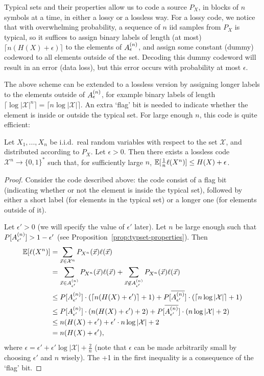 Typical sets and their properties allow us to code a source $P_X$, in blocks of $n$ symbols at a time, in either a lossy or a lossless way. For a lossy code, we notice that with overwhelming probability, a sequence of $n$ iid samples from $P_X$ is typical, so it suffices to assign binary labels of length (at most) $\lceil n (H(X) + \epsilon)\rceil$ to the elements of $A_{\epsilon}^{(n)}$, and assign some constant (dummy) codeword to all elements outside of the set. Decoding this dummy codeword will result in an error (data loss), but this error occurs with probability at most $\epsilon$.

The above scheme can be extended to a lossless version by assigning longer labels to the elements outside of $A_{\epsilon}^{(n)}$, for example binary labels of length $\lceil \log |\mathcal{X}|^n\rceil = \lceil n \log |\mathcal{X}|\rceil$. An extra `flag' bit is needed to indicate whether the element is inside or outside the typical set. For large enough $n$, this code is quite efficient:
\begin{theorem}
Let $X_1, ..., X_n$ be i.i.d.\ real random variables with respect to the set $\mathcal{X}$, and distributed according to $P_X$. Let $\epsilon > 0$. Then there exists a lossless code $\mathcal{X}^n \to \{0,1\}^*$ such that, for sufficiently large $n$, $\mathbb{E}[\frac{1}{n} \ell(X^n)] \leq H(X) + \epsilon$.
\end{theorem}
\begin{proof}
Consider the code described above: the code consist of a flag bit (indicating whether or not the element is inside the typical set), followed by either a short label (for elements in the typical set) or a longer one (for elements outside of it).

Let $\epsilon' > 0$ (we will specify the value of $\epsilon'$ later). Let $n$ be large enough such that $P[A_{\epsilon'}^{(n)}] > 1 - \epsilon'$ (see Proposition~\ref{prop:typset-properties}). Then
\begin{align}
\mathbb{E}[\ell(X^n)] &= \sum_{\vec{x} \in \mathcal{X}^n} P_{X^n}(\vec{x}) \ell(\vec{x})\nonumber\\
&= \sum_{\vec{x} \in A_{\epsilon'}^{(n)}} P_{X^n}(\vec{x}) \ell(\vec{x}) + \sum_{\vec{x} \not\in A_{\epsilon'}^{(n)}} P_{X^n}(\vec{x}) \ell(\vec{x})\nonumber\\
&\leq P[A_{\epsilon'}^{(n)}] \cdot (\lceil n (H(X) + \epsilon') \rceil + 1) + P[\overline{A_{\epsilon'}^{(n)}}] \cdot (\lceil n \log |\mathcal{X}| \rceil + 1)\nonumber\\
&\leq P[A_{\epsilon'}^{(n)}] \cdot (n (H(X) + \epsilon') + 2) + P[\overline{A_{\epsilon'}^{(n)}}] \cdot (n \log |\mathcal{X}| + 2)\nonumber\\
&\leq n ( H(X) + \epsilon') + \epsilon' \cdot n \log |\mathcal{X}| + 2\nonumber\\
&= n(H(X) + \epsilon'),
\end{align}
where $\epsilon = \epsilon' + \epsilon' \log |\mathcal{X}| + \frac{2}{n}$ (note that $\epsilon$ can be made arbitrarily small by choosing $\epsilon'$ and $n$ wisely). The +1 in the first inequality is a consequence of the `flag' bit.
\end{proof}
